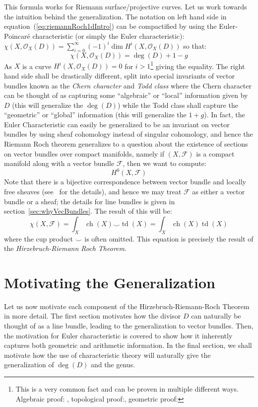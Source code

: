 \documentclass{book}
\newcommand{\CF}{{\mathcal{F}}}
\newcommand{\CO}{{\mathcal{O}}}
\newcommand{\ch}{{\operatorname{ch}}}
\renewcommand{\deg}{{\operatorname{deg}}}
\newcommand{\td}{{\operatorname{td}}}
\renewcommand{\ch}{{\operatorname{ch}}}
\begin{document}
This formula works for Riemann surface/projective curves. Let us work towards the intuition behind the
generalization. The notation on left hand side in equation~(\ref{eq:riemannRoch1dIntro}) can be compactified
by using the Euler-Poincar\'e characteristic (or simply the Euler characteristic): $\chi(X, \CO_X(D)) =
\sum_{i=0}^\infty (-1)^i \dim H^i(X, \CO_X(D))$ so that:
\[
  \chi(X, \CO_X(D)) = \deg(D) + 1-g
\]
As $X$ is a curve $H^i(X, \CO_X(D)) = 0$ for $i > 1$\footnote{This is a very common fact and can be proven in
multiple different ways. Algebraic proof: \cite[section~28.3]{NateAlgGeo}, topological
proof:\cite[chapter~3]{NateAlgTop}, geometric proof:\cite[chapter~3]{NateKTheory}} giving the equality. The
right hand side shall be drastically different, split into special invariants of vector bundles known as the
\emph{Chern character} and \emph{Todd class} where the Chern character can be thought of as capturing some ``algebraic'' or
``local'' information given by $D$ (this will generalize the $\deg(D)$) while the Todd class shall capture the
``geometric'' or ``global'' information (this will generalize the $1+g$). In fact, the Euler Characteristic
can easily be generalized to be an invariant on vector bundles by using sheaf cohomology instead of singular
cohomology, and hence the Riemann Roch theorem generalizes to a question about the existence of sections on
vector bundles over compact manifolds, namely if $(X,\CF)$ is a compact manifold along with a vector bundle
$\CF$, then we want to compute:
\[
  H^0(X, \CF)
\]
Note that there is a bijective correspondence between vector bundle and locally free sheaves
(see~\cite[chapter~4]{NateAlgGeo} for the details), and hence we may treat $\CF$ as either a vector bundle or
a sheaf; the details for line bundles is given in section~\ref{sec:whyVecBundles}. The result of this will be:
\[
  \chi(X, \CF) = \int_X \ch(X)\smile \td(X) = \int_X \ch(X)\td(X)
\]
where the cup product $\smile$ is often omitted. This equation is precisely the result of the
\emph{Hirzebruch-Riemann Roch Theorem}.

\section{Motivating the Generalization}

Let us now motivate each component of the Hirzebruch-Riemann-Roch Theorem in more detail. The first section
motivates how the divisor $D$ can naturally be thought of as a line bundle, leading to the generalization to
vector bundles. Then, the motivation for Euler characteristic is covered to show how it inherently captures
both geometric and arithmetic information. In the final section, we shall motivate how the use of characteristic
theory will naturally give the generalization of $\deg(D)$ and the genus.
\end{document}
